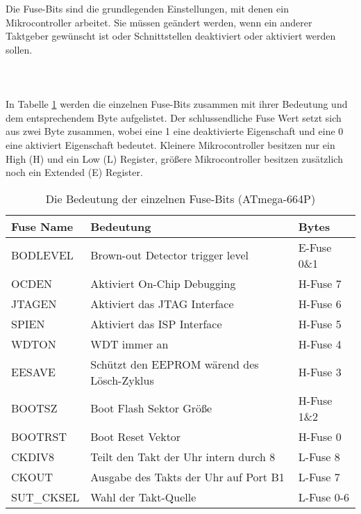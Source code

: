 Die Fuse-Bits sind die grundlegenden Einstellungen, mit denen ein
Mikrocontroller arbeitet. Sie müssen geändert werden, wenn ein anderer Taktgeber
gewünscht ist oder Schnittstellen deaktiviert oder aktiviert werden sollen.\\
\\
\\
\\
In Tabelle \ref{fuses-names} werden die einzelnen Fuse-Bits zusammen mit ihrer
Bedeutung und dem entsprechendem Byte aufgelistet. Der schlussendliche Fuse Wert
setzt sich aus zwei Byte zusammen, wobei eine 1 eine deaktivierte Eigenschaft und
eine 0 eine aktiviert Eigenschaft bedeutet. Kleinere Mikrocontroller besitzen nur ein
High (H) und ein Low (L) Register, größere Mikrocontroller besitzen zusätzlich
noch ein Extended (E) Register.

\begin{table} [H]
\begin{tabular}{|l|l|l|} \hline
Fuse Name & Bedeutung & Bytes\\ \hline
BODLEVEL & Brown-out Detector trigger level & E-Fuse 0\&1\\ \hline
OCDEN & Aktiviert On-Chip Debugging & H-Fuse 7\\ \hline
JTAGEN & Aktiviert das \ac{JTAG} Interface & H-Fuse 6\\ \hline
SPIEN & Aktiviert das \ac{ISP} Interface & H-Fuse 5\\ \hline
WDTON & \ac{WDT} immer an & H-Fuse 4\\ \hline
EESAVE & Schützt den \acs{EEPROM} wärend des Lösch-Zyklus & H-Fuse 3\\ \hline
BOOTSZ & Boot Flash Sektor Größe & H-Fuse 1\&2\\ \hline
BOOTRST & Boot Reset Vektor & H-Fuse 0\\ \hline
CKDIV8 & Teilt den Takt der Uhr intern durch 8 & L-Fuse 8\\ \hline
CKOUT & Ausgabe des Takts der Uhr auf Port B1 & L-Fuse 7\\ \hline
SUT\_CKSEL & Wahl der Takt-Quelle & L-Fuse 0-6\\ \hline
\end{tabular}
\caption{Die Bedeutung der einzelnen Fuse-Bits (ATmega-664P)}
\label{fuses-names}
\end{table}

